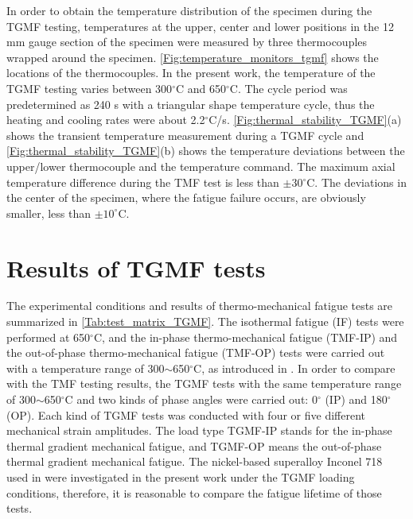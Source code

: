 \documentclass[preprint,5p,twocolumn,10pt,sort&compress]{elsarticle}
\begin{document}
In order to obtain the temperature distribution of the specimen during the TGMF testing, temperatures at the upper, center and lower positions in the 12 mm gauge section of the specimen were measured by three thermocouples wrapped around the specimen. \autoref{Fig:temperature_monitors_tgmf} shows the locations of the thermocouples. In the present work, the temperature of the TGMF testing varies between 300$^\circ$C and 650$^\circ$C. The cycle period was predetermined as 240 s with a triangular shape temperature cycle, thus the heating and cooling rates were about 2.2$^\circ$C/s.
\autoref{Fig:thermal_stability_TGMF}(a) shows the transient temperature measurement during a TGMF cycle and \autoref{Fig:thermal_stability_TGMF}(b) shows the temperature deviations between the upper/lower thermocouple and the temperature command.
The maximum axial temperature difference during the TMF test is less than $\pm30$$^\circ$C. The deviations in the center of the specimen, where the fatigue failure occurs, are obviously smaller, less than $\pm 10^\circ$C. 


\section{Results of TGMF tests}

The experimental conditions and results of thermo-mechanical fatigue tests are summarized in \autoref{Tab:test_matrix_TGMF}. The isothermal fatigue (IF) tests were performed at 650$^\circ$C, and the in-phase thermo-mechanical fatigue (TMF-IP) and the out-of-phase thermo-mechanical fatigue (TMF-OP) tests were carried out with a temperature range of 300$\sim$650$^\circ$C, as introduced in \cite{SUN2019228, SUN201989}. In order to compare with the TMF testing results, the TGMF tests with the same temperature range of 300$\sim$650$^\circ$C and two kinds of phase angles were carried out: 0$^\circ$ (IP) and 180$^\circ$ (OP). Each kind of TGMF tests was conducted with four or five different mechanical strain amplitudes. The load type TGMF-IP stands for the in-phase thermal gradient mechanical fatigue, and TGMF-OP means the out-of-phase thermal gradient mechanical fatigue. The nickel-based superalloy Inconel 718 used in \cite{SUN2019228, SUN201989} were investigated in the present work under the TGMF loading conditions, therefore, it is reasonable to compare the fatigue lifetime of those tests.
\end{document}
